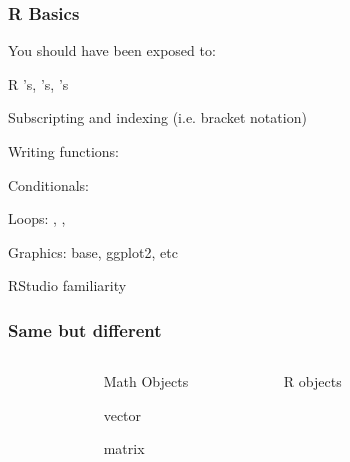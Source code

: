 \documentclass[12pt]{beamer}\usepackage[]{graphicx}\usepackage[]{color}
\begin{document}

\begin{frame}
\frametitle{R Basics}

You should have been exposed to:

\bi
  \item R 's, 's, 's
  \item Subscripting and indexing (i.e. bracket notation)
  \item Writing functions: 
  \item Conditionals: 
  \item Loops: , , 
  \item Graphics: base, ggplot2, etc
  \item RStudio familiarity
\ei

\end{frame}


\begin{frame}[fragile]
\frametitle{Same but different}

\begin{columns}[t]
\begin{column}{0.1\textwidth}
\end{column}

\begin{column}{0.4\textwidth}
{\Large
{\mdlit Math Objects} \\
\bi
  \item vector
  \item matrix
\ei
}
\end{column}

\pause

\begin{column}{0.4\textwidth}
{\Large
{\mdlit R objects} \\
\bi
  \item {}
  \item {}
\ei
}
\end{column}

\begin{column}{0.1\textwidth}
\end{column}
\end{columns}

\end{frame}
\end{document}
